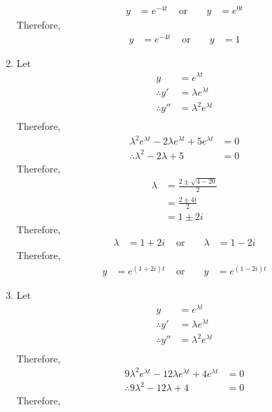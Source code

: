 \documentclass[fleqn, a4paper, 11pt, oneside]{amsart}
\theoremstyle{definition}
\theoremstyle{theorem}
\begin{document}
\begin{solution}
\begin{enumerate}[leftmargin = *]
\begin{align*}
				y & = e^{-4 t} & \text{ or } &  & y & = e^{0 t}
			\end{align*}
			Therefore,
			\begin{align*}
				y & = e^{-4 t} & \text{ or } &  & y & = 1
			\end{align*}
		\item
			Let
			\begin{align*}
				y              & = e^{\lambda t}           \\
				\therefore y'  & = \lambda e^{\lambda t}   \\
				\therefore y'' & = \lambda^2 e^{\lambda t} \\
			\end{align*}
			Therefore,
			\begin{align*}
				\lambda^2 e^{\lambda t} - 2 \lambda e^{\lambda t} + 5 e^{\lambda t} & = 0 \\
				\therefore \lambda^2 - 2 \lambda + 5                                & = 0
			\end{align*}
			Therefore,
			\begin{align*}
				\lambda & = \frac{2 \pm \sqrt{4 - 20}}{2} \\
                                        & = \frac{2 \pm 4 i}{2}           \\
                                        & = 1 \pm 2 i
			\end{align*}
			Therefore,
			\begin{align*}
				\lambda & = 1 + 2 i & \text{ or } &  & \lambda & = 1 - 2 i
			\end{align*}
			Therefore,
			\begin{align*}
				y & = e^{(1 + 2 i) t} & \text{ or } &  & y & = e^{(1 - 2 i) t}
			\end{align*}
		\item
			Let
			\begin{align*}
				y              & = e^{\lambda t}           \\
				\therefore y'  & = \lambda e^{\lambda t}   \\
				\therefore y'' & = \lambda^2 e^{\lambda t} \\
			\end{align*}
			Therefore,
			\begin{align*}
				9 \lambda^2 e^{\lambda t} - 12 \lambda e^{\lambda t} + 4 e^{\lambda t} & = 0 \\
				\therefore 9 \lambda^2 - 12 \lambda + 4                                & = 0
			\end{align*}
			Therefore,

\end{enumerate}
\end{solution}
\end{document}
